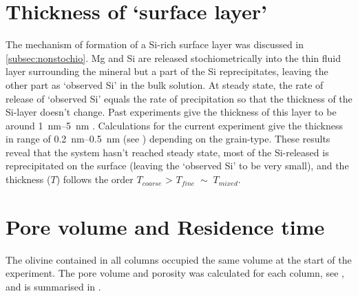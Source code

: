 \section{Thickness of `surface layer'}
The mechanism of formation of a Si-rich surface layer was discussed in \cref{subsec:nonstochio}. Mg and Si are released stochiometrically into the thin fluid layer surrounding the mineral but a part of the Si reprecipitates, leaving the other part as `observed Si' in the bulk solution. At steady state, the rate of release of `observed Si' equals the rate of precipitation so that the thickness of the Si-layer doesn't change. Past experiments give the thickness of this layer to be around \SIrange[range-units = single,range-phrase = --]{1}{5}{\nano\meter} \citep{hellmann2012,pokrovsky2000}. Calculations for the current experiment give the thickness in range of  \SIrange{0.2}{0.5}{\nano\meter} (see\; ) depending on the grain-type. These results reveal that the system hasn't reached steady state, most of the Si-released is reprecipitated on the surface (leaving the `observed Si' to be very small), and the thickness ($T$) follows the order $T_{coarse}$ > $T_{fine}\; \sim\;T_{mixed}$.
\section{Pore volume and Residence time}\label{sec:results_pvrt}
The olivine contained in all columns occupied the same volume at the start of the experiment. The pore volume and porosity was calculated for each column, see , and is summarised in . 

